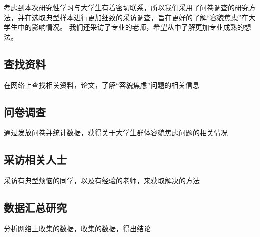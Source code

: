 考虑到本次研究性学习与大学生有着密切联系，所以我们采用了问卷调查的研究方法，并在选取典型样本进行更加细致的采访调查，旨在更好的了解``容貌焦虑''在大学生中的影响情况。
我们还采访了专业的老师，希望从中了解更加专业成熟的想法。
\subsection{查找资料}
在网络上查找相关资料，论文，了解``容貌焦虑''问题的相关信息
\subsection{问卷调查}
通过发放问卷并统计数据，获得关于大学生群体容貌焦虑问题的相关情况
\subsection{采访相关人士}
采访有典型烦恼的同学，以及有经验的老师，来获取解决的方法
\subsection{数据汇总研究}
分析网络上收集的数据，收集的数据，得出结论
